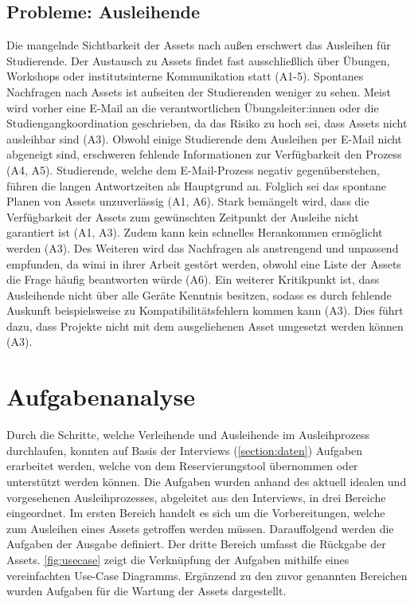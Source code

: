 \subsection{Probleme: Ausleihende}
\label{section:probleme-Ausleihende}
Die mangelnde Sichtbarkeit der Assets nach außen erschwert das Ausleihen für
Studierende. Der Austausch zu Assets findet fast ausschließlich über Übungen,
Workshops oder institutsinterne Kommunikation statt (A1-5). Spontanes Nachfragen
nach Assets ist aufseiten der Studierenden weniger zu sehen. Meist wird vorher
eine E-Mail an die verantwortlichen Übungsleiter:innen oder die
Studiengangkoordination geschrieben, da das Risiko zu hoch sei, dass Assets
nicht ausleihbar sind (A3). Obwohl einige Studierende dem Ausleihen per E-Mail
nicht abgeneigt sind, erschweren fehlende Informationen zur Verfügbarkeit den
Prozess (A4, A5). Studierende, welche dem E-Mail-Prozess negativ
gegenüberstehen, führen die langen Antwortzeiten als Hauptgrund an. Folglich sei
das spontane Planen von Assets unzuverlässig (A1, A6). Stark bemängelt wird,
dass die Verfügbarkeit der Assets zum gewünschten Zeitpunkt der Ausleihe nicht
garantiert ist (A1, A3). Zudem kann kein schnelles Herankommen ermöglicht werden
(A3). Des Weiteren wird das Nachfragen als anstrengend und unpassend empfunden,
da \ac{wimi} in ihrer Arbeit gestört werden, obwohl eine Liste der Assets die
Frage häufig beantworten würde (A6). Ein weiterer Kritikpunkt ist, dass
Ausleihende nicht über alle Geräte Kenntnis besitzen, sodass es durch fehlende
Auskunft beispielsweise zu Kompatibilitätsfehlern kommen kann (A3). Dies führt
dazu, dass Projekte nicht mit dem ausgeliehenen Asset umgesetzt werden können
(A3).

\section{Aufgabenanalyse}
\label{section:aufgaben}
Durch die Schritte, welche Verleihende und Ausleihende im Ausleihprozess durchlaufen, konnten auf
Basis der Interviews (\ref{section:daten}) Aufgaben erarbeitet werden, welche von dem
Reservierungstool übernommen oder unterstützt werden können. Die Aufgaben wurden anhand des aktuell
idealen und vorgesehenen Ausleihprozesses, abgeleitet aus den Interviews, in drei Bereiche
eingeordnet. Im ersten Bereich handelt es sich um die Vorbereitungen, welche zum Ausleihen eines
Assets getroffen werden müssen. Darauffolgend werden die Aufgaben der Ausgabe definiert. Der dritte
Bereich umfasst die Rückgabe der Assets. \ref{fig:usecase} zeigt die Verknüpfung der Aufgaben
mithilfe eines vereinfachten Use-Case Diagramms. Ergänzend zu den zuvor genannten Bereichen wurden
Aufgaben für die Wartung der Assets dargestellt.

